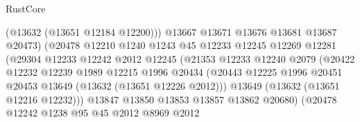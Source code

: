 \begin{lexlean}{RustCore}
\begin{coremodule}
                                      (@13632 (@13651 @12184 @12200)))
                                    @13667
                                    @13671
                                    @13676
                                    @13681
                                    @13687
                                    @20473)
                                  (@20478
                                    @12210
                                    @1240
                                    @1243
                                    @45
                                    @12233
                                    @12245
                                    @12269
                                    @12281
                                    (@29304
                                      @12233
                                      @12242
                                      @2012
                                      @12245
                                      (@21353
                                        @12233
                                        @12240
                                        @2079
                                        (@20422
                                          @12232
                                          @12239
                                          @1989
                                          @12215
                                          @1996
                                          @20434
                                          (@20443
                                            @12225
                                            @1996
                                            @20451
                                            @20453
                                            @13649
                                            (@13632 (@13651 @12226 @2012)))
                                          @13649
                                          (@13632 (@13651 @12216 @12232)))
                                        @13847
                                        @13850
                                        @13853
                                        @13857
                                        @13862
                                        @20680)
                                      (@20478
                                        @12242
                                        @1238
                                        @95
                                        @45
                                        @2012
                                        @8969
                                        @2012

\end{coremodule}
\end{lexlean}
